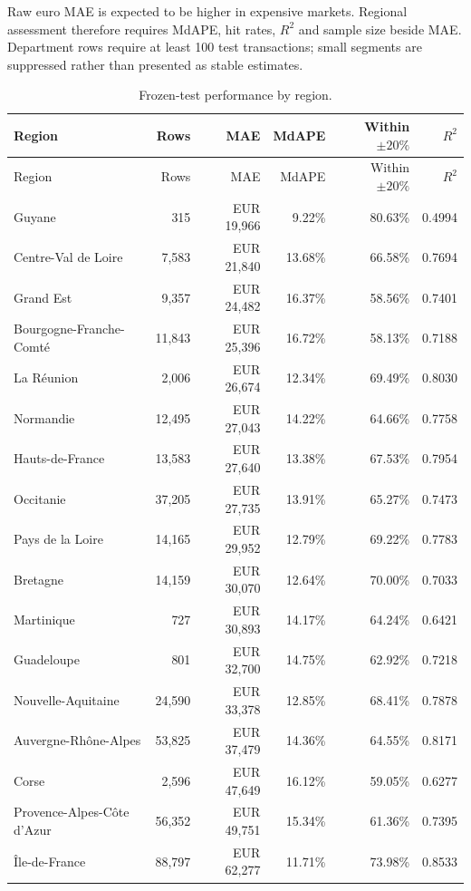 \documentclass[11pt,a4paper]{article}
\begin{document}
Raw euro MAE is expected to be higher in expensive markets. Regional assessment
therefore requires MdAPE, hit rates, $R^2$ and sample size beside MAE. Department
rows require at least 100 test transactions; small segments are suppressed
rather than presented as stable estimates.


\begin{longtable}{p{4.1cm}rrrrr}
\caption{Frozen-test performance by region.}\label{tab:regions}\\
\toprule
Region & Rows & MAE & MdAPE & Within $\pm20\%$ & $R^2$ \\
\midrule
\endfirsthead
\toprule
Region & Rows & MAE & MdAPE & Within $\pm20\%$ & $R^2$ \\
\midrule
\endhead
Guyane & 315 & EUR 19,966 & 9.22\% & 80.63\% & 0.4994 \\
Centre-Val de Loire & 7,583 & EUR 21,840 & 13.68\% & 66.58\% & 0.7694 \\
Grand Est & 9,357 & EUR 24,482 & 16.37\% & 58.56\% & 0.7401 \\
Bourgogne-Franche-Comté & 11,843 & EUR 25,396 & 16.72\% & 58.13\% & 0.7188 \\
La Réunion & 2,006 & EUR 26,674 & 12.34\% & 69.49\% & 0.8030 \\
Normandie & 12,495 & EUR 27,043 & 14.22\% & 64.66\% & 0.7758 \\
Hauts-de-France & 13,583 & EUR 27,640 & 13.38\% & 67.53\% & 0.7954 \\
Occitanie & 37,205 & EUR 27,735 & 13.91\% & 65.27\% & 0.7473 \\
Pays de la Loire & 14,165 & EUR 29,952 & 12.79\% & 69.22\% & 0.7783 \\
Bretagne & 14,159 & EUR 30,070 & 12.64\% & 70.00\% & 0.7033 \\
Martinique & 727 & EUR 30,893 & 14.17\% & 64.24\% & 0.6421 \\
Guadeloupe & 801 & EUR 32,700 & 14.75\% & 62.92\% & 0.7218 \\
Nouvelle-Aquitaine & 24,590 & EUR 33,378 & 12.85\% & 68.41\% & 0.7878 \\
Auvergne-Rhône-Alpes & 53,825 & EUR 37,479 & 14.36\% & 64.55\% & 0.8171 \\
Corse & 2,596 & EUR 47,649 & 16.12\% & 59.05\% & 0.6277 \\
Provence-Alpes-Côte d'Azur & 56,352 & EUR 49,751 & 15.34\% & 61.36\% & 0.7395 \\
Île-de-France & 88,797 & EUR 62,277 & 11.71\% & 73.98\% & 0.8533 \\
\bottomrule
\end{longtable}
\end{document}
